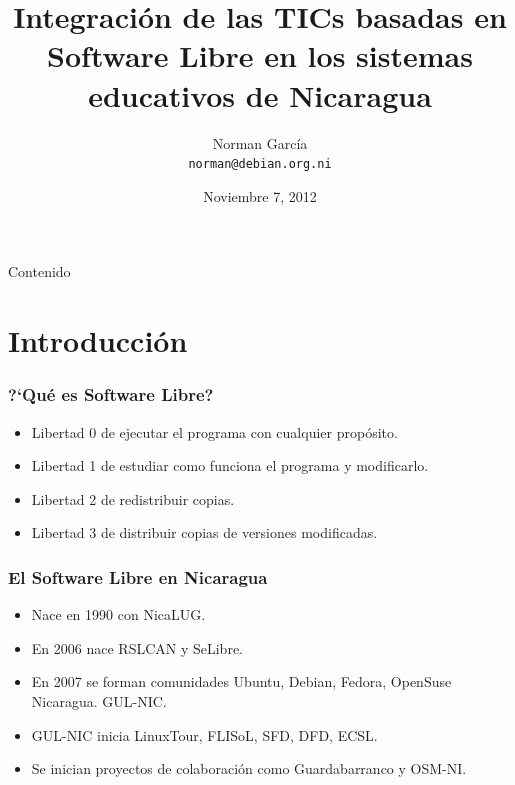 \documentclass{beamer}
\title{Integraci\'on de las TICs basadas en Software Libre en los sistemas educativos de Nicaragua}
\author[n0rman]{Norman Garc\'ia \\ \texttt{norman@debian.org.ni}}
\institute{Debian Nicaragua}
\date{Noviembre 7, 2012}
\begin{document}
\begin{frame}
	\titlepage
\end{frame}

\begin{frame}{Contenido}
	\tableofcontents
\end{frame}


\section{Introducci\'on}

\begin{frame}
\frametitle{?`Qu\'e es Software Libre?}
        
	\begin{itemize}
                \pause \item Libertad \alert{0} de ejecutar el programa con cualquier prop\'osito.
		\pause \item Libertad \alert{1} de estudiar como funciona el programa y modificarlo.
		\pause \item Libertad \alert{2} de redistribuir copias.
		\pause \item Libertad \alert{3} de distribuir copias de versiones modificadas.
       \end{itemize}

\end{frame}

\begin{frame}
\frametitle{El Software Libre en Nicaragua}    
        \begin{itemize}
                \pause \item Nace en \alert{1990} con NicaLUG.
		\pause \item En \alert{2006} nace RSLCAN y SeLibre.
		\pause \item En \alert{2007} se forman comunidades Ubuntu, Debian, Fedora, OpenSuse Nicaragua. GUL-NIC.
	     	\pause \item GUL-NIC inicia LinuxTour, FLISoL, SFD, DFD, ECSL.
		\pause \item Se inician proyectos de colaboraci\'on como \alert{Guardabarranco} y \alert{OSM-NI}.
    \end{itemize}
\end{frame}
\end{document}
